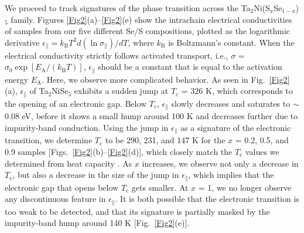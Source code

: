 \documentclass[aps,prl,twocolumn,superscriptaddress]{revtex4-2}
\begin{document}
We proceed to track signatures of the phase transition across the Ta$_2$Ni(S$_x$Se$_{1-x}$)$_5$ family. Figures \ref{Fig2}(a)--\ref{Fig2}(e) show the intrachain electrical conductivities of samples from our five different Se/S compositions, plotted as the logarithmic derivative $\epsilon_\parallel = k_\textrm{B} T^2 d (\ln \sigma_\parallel)/dT$, where $k_\textrm{B}$ is Boltzmann's constant. When the electrical conductivity strictly follows activated transport, i.e., $\sigma$ = $\sigma_0 \exp [E_\textrm{A}/(k_\textrm{B} T)]$, $\epsilon_\parallel$ should be a constant that is equal to the activation energy $E_\textrm{A}$. Here, we observe more complicated behavior. As seen in Fig.~\ref{Fig2}(a), $\epsilon_\parallel$ of Ta$_2$NiSe$_5$ exhibits a sudden jump at $T_c$ = 326 K, which corresponds to the opening of an electronic gap. Below $T_c$, $\epsilon_\parallel$ slowly decreases and saturates to $\sim$0.08 eV, before it shows a small hump around 100 K and decreases further due to impurity-band conduction. Using the jump in $\epsilon_\parallel$ as a signature of the electronic transition, we determine $T_\textrm{c}$ to be 290, 231, and 147 K for the $x$ = 0.2, 0.5, and 0.9 samples [Figs.~\ref{Fig2}(b)--\ref{Fig2}(d)], which closely match the $T_\textrm{c}$ values we determined from heat capacity \cite{SM}. As $x$ increases, we observe not only a decrease in $T_\textrm{c}$, but also a decrease in the size of the jump in $\epsilon_\parallel$, which implies that the electronic gap that opens below $T_\textrm{c}$ gets smaller. At $x$ = 1, we no longer observe any discontinuous feature in $\epsilon_\parallel$. It is both possible that the electronic transition is too weak to be detected, and that its signature is partially masked by the impurity-band hump around 140 K [Fig.~\ref{Fig2}(e)].
\end{document}
